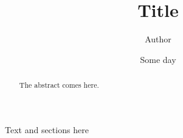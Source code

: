 \documentclass{article}
\title{Title}
\author{Author}
\date{Some day}
\begin{document}
    \maketitle

    \begin{abstract}
        The abstract comes here.
    \end{abstract}

    Text and sections here
\end{document}
